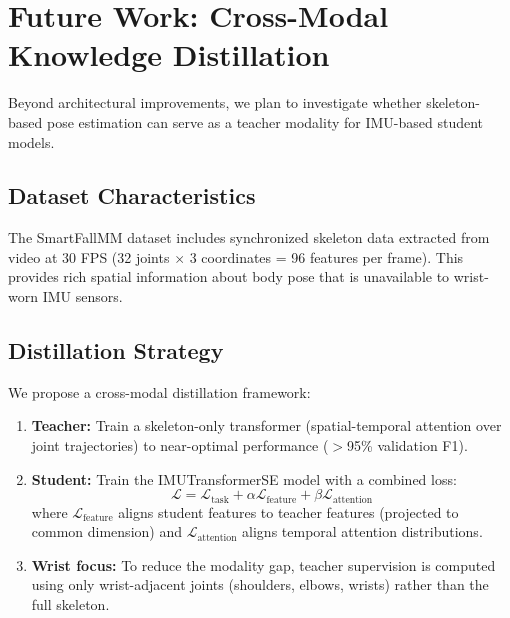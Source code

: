\section{Future Work: Cross-Modal Knowledge Distillation}

Beyond architectural improvements, we plan to investigate whether skeleton-based pose estimation can serve as a teacher modality for IMU-based student models.

\subsection{Dataset Characteristics}

The SmartFallMM dataset includes synchronized skeleton data extracted from video at 30 FPS (32 joints $\times$ 3 coordinates = 96 features per frame). This provides rich spatial information about body pose that is unavailable to wrist-worn IMU sensors.

\subsection{Distillation Strategy}

We propose a cross-modal distillation framework:
\begin{enumerate}[label=\arabic*.]
    \item \textbf{Teacher:} Train a skeleton-only transformer (spatial-temporal attention over joint trajectories) to near-optimal performance ($>$95\% validation F1).
    \item \textbf{Student:} Train the IMUTransformerSE model with a combined loss:
    \begin{equation}
        \mathcal{L} = \mathcal{L}_{\text{task}} + \alpha \mathcal{L}_{\text{feature}} + \beta \mathcal{L}_{\text{attention}}
    \end{equation}
    where $\mathcal{L}_{\text{feature}}$ aligns student features to teacher features (projected to common dimension) and $\mathcal{L}_{\text{attention}}$ aligns temporal attention distributions.
    \item \textbf{Wrist focus:} To reduce the modality gap, teacher supervision is computed using only wrist-adjacent joints (shoulders, elbows, wrists) rather than the full skeleton.
\end{enumerate}

